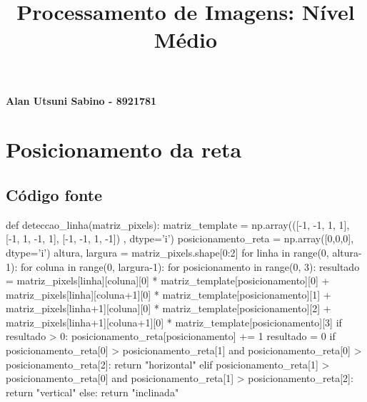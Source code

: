 \documentclass[a4paper,12pt]{article}
\begin{document}
\title{ \large \textbf{Processamento de Imagens: Nível Médio}}
\date{\vspace{-5ex}}
\maketitle

\begin{flushright}
  { \bf Alan Utsuni Sabino - 8921781}
\end{flushright}


\section{Posicionamento da reta}
\subsection{Código fonte}
\begin{python}
def deteccao_linha(matriz_pixels):
  matriz_template = np.array(([-1, -1, 1, 1], [-1, 1, -1, 1], [-1, -1, 1, -1])
    , dtype='i')
  posicionamento_reta = np.array([0,0,0], dtype='i')
  altura, largura = matriz_pixels.shape[0:2]
  for linha in range(0, altura-1):
    for coluna in range(0, largura-1):
      for posicionamento in range(0, 3):
        resultado = matriz_pixels[linha][coluna][0] *
          matriz_template[posicionamento][0] + matriz_pixels[linha][coluna+1][0]
          * matriz_template[posicionamento][1] + matriz_pixels[linha+1][coluna][0]
          * matriz_template[posicionamento][2] +
          matriz_pixels[linha+1][coluna+1][0] * matriz_template[posicionamento][3]
        if resultado > 0:
          posicionamento_reta[posicionamento] += 1
          resultado = 0
  if posicionamento_reta[0] > posicionamento_reta[1] and
   posicionamento_reta[0] > posicionamento_reta[2]:
    return "horizontal"
  elif posicionamento_reta[1] > posicionamento_reta[0] and
   posicionamento_reta[1] > posicionamento_reta[2]:
    return "vertical"
  else:
    return "inclinada"
\end{python}
\end{document}
